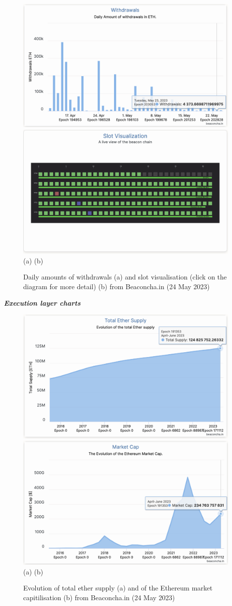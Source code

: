 \documentclass[UTF8]{article}
\begin{document}
{\begin{figure}[htbp]
\begin{center}
\includegraphics[width=0.48\linewidth]{images/bchart15}
\includegraphics[width=0.48\linewidth]{images/bchart16} \\
(a)\hspace{160pt}        (b)\\
\caption{Daily amounts of withdrawals (a) and slot visualisation (click on the diagram for more detail) (b) from Beaconcha.in (24 May 2023)}
\label{fig:chart15}
\end{center}
\end{figure}
\clearpage

\textit{\textbf{Execution layer charts}}
\begin{figure}[htbp]
\begin{center}
\includegraphics[width=0.48\linewidth]{images/bchart17}
\includegraphics[width=0.48\linewidth]{images/bchart18} \\
(a)\hspace{160pt}        (b)\\
\caption{Evolution of total ether supply (a) and of the Ethereum market capitilisation (b) from Beaconcha.in (24 May 2023)}
\label{fig:chart17}
\end{center}
\end{figure}

}
\end{document}
